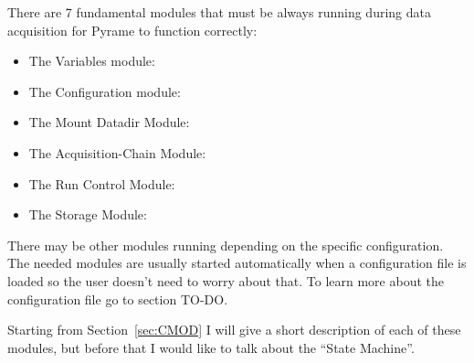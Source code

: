 There are 7 fundamental modules that must be always running during
data acquisition for Pyrame to function correctly:
\begin{itemize}
\item The Variables module: 
\item The Configuration module: 
\item The Mount Datadir Module: 
\item The Acquisition-Chain Module: 
\item The Run Control Module: 
\item The Storage Module: 
\end{itemize}
There may be other modules running depending on the specific
configuration. The needed modules are usually started automatically
when a configuration file is loaded so the user doesn't need to worry
about that. To learn more about the configuration file go to section
TO-DO.\@

Starting from Section~\ref{sec:CMOD} I will give a short description
of each of these modules, but before that I would like to talk about
the ``State Machine''.

